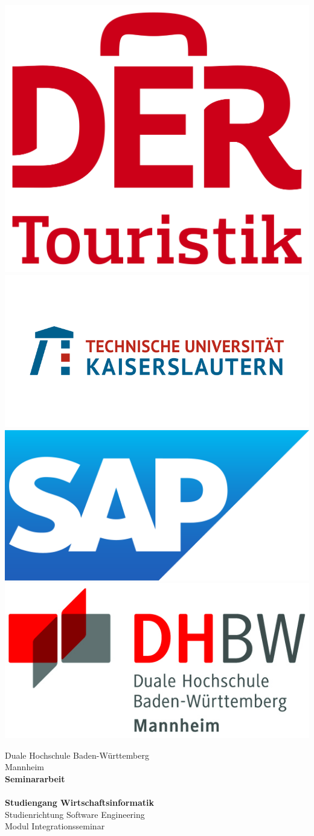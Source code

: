 \begin{titlepage}

\begin{minipage}{\textwidth}
	\vspace{-2cm}
	\noindent
	\includegraphics[height=0.1\linewidth]{img/logos/der}
	\hfill
	\includegraphics[height=0.1\linewidth]{img/logos/tukl}
	\hfill
	\includegraphics[height=0.1\linewidth]{img/logos/sap}
	\hfill
	\includegraphics[height=0.1\linewidth]{img/logos/dhbw}
\end{minipage}

\vspace{0em}
\sffamily

\begin{center}
	\textsf{\large{}Duale Hochschule Baden-Württemberg\\[1.5mm] Mannheim}\\[2em]
	\textsf{\textbf{\Large{}Seminararbeit}}\\[3mm]
	\textsf{\textbf{\DerTitelDerArbeit}}\\[1cm]
	\textsf{\textbf{\Large{}Studiengang Wirtschaftsinformatik}\\[1mm] \textsf{Studienrichtung Software Engineering}\\[1mm]
	\textsf{Modul Integrationsseminar}}
	
	\vspace{2em}
	\vfill

	\begin{minipage}{\textwidth}
	

\end{minipage}
\end{center}
\end{titlepage}
